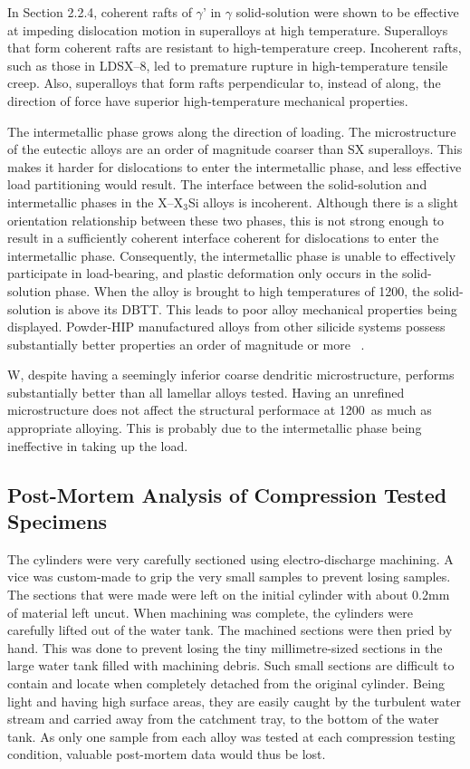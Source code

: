 In Section 2.2.4, coherent rafts of $\gamma$' in $\gamma$ solid-solution were shown to be effective at impeding dislocation motion in superalloys at high temperature.  Superalloys that form coherent rafts are resistant to high-temperature creep.  Incoherent rafts, such as those in LDSX--8, led to premature rupture in high-temperature tensile creep.  Also, superalloys that form rafts perpendicular to, instead of along, the direction of force have superior high-temperature mechanical properties.  

The intermetallic phase grows along the direction of loading.  The microstructure of the eutectic alloys are an order of magnitude coarser than SX superalloys.  This makes it harder for dislocations to enter the intermetallic phase, and less effective load partitioning would result.  The interface between the solid-solution and intermetallic phases in the X--X$_3$Si alloys is incoherent.  Although there is a slight orientation relationship between these two phases, this is not strong enough to result in a sufficiently coherent interface coherent for dislocations to enter the intermetallic phase.  Consequently, the intermetallic phase is unable to effectively participate in load-bearing, and plastic deformation only occurs in the solid-solution phase.  When the alloy is brought to high temperatures of 1200\celsius, the solid-solution is above its DBTT.  This leads to poor alloy mechanical properties being displayed.  Powder-HIP manufactured alloys from other silicide systems possess substantially better properties an order of magnitude or more ~\cite{jain10}.

W, despite having a seemingly inferior coarse dendritic microstructure, performs substantially better than all lamellar alloys tested.  Having an unrefined microstructure does not affect the structural performace at 1200\celsius\ as much as appropriate alloying.  This is probably due to the intermetallic phase being ineffective in taking up the load.

\subsection{Post-Mortem Analysis of Compression Tested Specimens}

The cylinders were very carefully sectioned using electro-discharge machining.  A vice was custom-made to grip the very small samples to prevent losing samples.  The sections that were made were left on the initial cylinder with about 0.2mm of material left uncut.  When machining was complete, the cylinders were carefully lifted out of the water tank.  The machined sections were then pried by hand.  This was done to prevent losing the tiny millimetre-sized sections in the large water tank filled with machining debris.  Such small sections are difficult to contain and locate when completely detached from the original cylinder. Being light and having high surface areas, they are easily caught by the turbulent water stream and carried away from the catchment tray, to the bottom of the water tank.  As only one sample from each alloy was tested at each compression testing condition, valuable post-mortem data would thus be lost.
	
